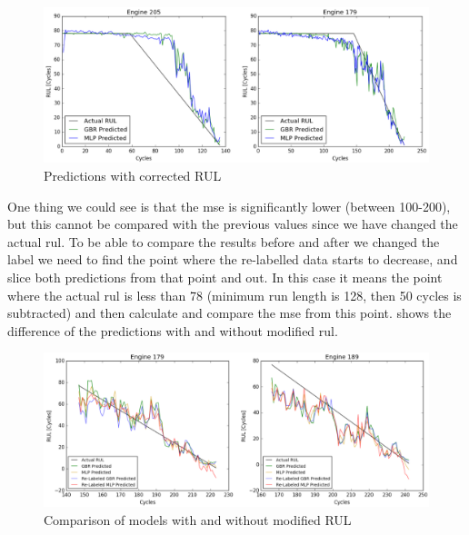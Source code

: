 \documentclass[english, a4paper]{report}
\begin{document}
{{{{                \begin{figure}[H]
                    \centering \includegraphics[width=1\linewidth]{OElabeledRUL}
                    \caption{Predictions with corrected RUL}
                    \label{fig:OElabeledRUL}
                \end{figure}
                
                One thing we could see is that the \gls{mse} is significantly lower (between 100-200), but this cannot be compared with the previous values since we have changed the actual \gls{rul}. To be able to compare the results before and after we changed the label we need to find the point where the re-labelled data starts to decrease, and slice both predictions from that point and out. In this case it means the point where the actual \gls{rul} is less than 78 (minimum run length is 128, then 50 cycles is subtracted) and then calculate and compare the \gls{mse} from this point.  shows the difference of the predictions with and without modified \gls{rul}. 
                
                \begin{figure}[H]
                    \centering \includegraphics[width=1\linewidth]{comparisonBeforeFilter}
                    \caption{Comparison of models with and without modified RUL}
                    \label{fig:comparisonBeforeFilter}
                \end{figure}
                
}}}}
\end{document}
